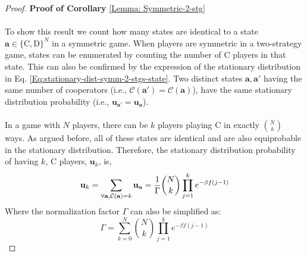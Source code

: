 \documentclass[11pt]{article}
\theoremstyle{plainCl1}
\theoremstyle{plainCl2}
\newcommand{\abf}{\mathbf{a}}
\newcommand{\ubf}{\mathbf{u}}
\newcommand{\C}{\mathrm{C}}
\newcommand{\D}{\mathrm{D}}
\begin{document}
\newpage
\begin{proof}
\textbf{Proof of Corollary} \ref{Lemma: Symmetric-2-stg} \\ \\
To show this result we count how many states are identical to a state $\abf \in \{\C,\D\}^N$ in a symmetric game. When players are symmetric in a two-strategy game, states can be enumerated by counting the number of $\C$ players in that state. This can also be confirmed by the expression of the stationary distribution in Eq. \ref{Eq:stationary-dist-symm-2-stgs-state}. Two distinct states $\abf, \abf'$ having the same number of cooperators (i.e., $\mathcal{C}(\abf') = \mathcal{C}(\abf)$), have the same stationary distribution probability (i.e., $\ubf_{\abf'} = \ubf_{\abf}$).
\\ \\ 
\noindent In a game with $N$ players, there can be $k$ players playing $\C$ in exactly $N \choose k$ ways. As argued before, all of these states are identical and are also equiprobable in the stationary distribution. Therefore, the stationary distribution probability of having $k$, $\C$ players, $\ubf_{k}$, is,
\begin{equation}
\ubf_{k} = \sum_{\forall \abf,  \mathcal{C(\abf)} = k} \ubf_\abf = \frac{1}{\Gamma} {N \choose k} \prod_{j=1}^k e^{-\beta f(j-1)} \\[10pt]
\end{equation} 
\noindent Where the normalization factor $\Gamma$ can also be simplified as: 
\begin{equation}
\Gamma = \sum_{k=0}^N {N \choose k} \prod_{j=1}^k e^{-\beta f(j-1)}
\end{equation}
\end{proof}
\newpage


\end{document}
